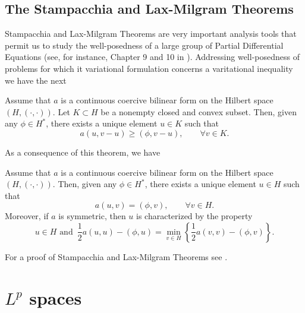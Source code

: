 \subsection*{The Stampacchia and Lax-Milgram Theorems}
Stampacchia and Lax-Milgram Theorems are very important analysis tools that permit us to study the well-posedness of a large group of Partial Differential Equations (see, for instance, Chapter 9 and 10 in \cite{brezis2011}). Addressing well-posedness of problems for which it variational formulation concerns a varitational inequality we have the next
\begin{theorem}[Stampacchia]\label{theo:stampacchia}Assume that $a$ is a continuous coercive bilinear form on the Hilbert space $(H,(\cdot,\cdot))$. Let $K\subset H$ be a nonempty closed and convex subset. Then, given any $\phi \in H^*$, there exists a unique element $u\in K$ such that
\begin{equation}
	a(u,v-u)\geq \left( \phi,v-u\right),\qquad \forall v \in K.
\end{equation}
\end{theorem}
As a consequence of this theorem, we have
\begin{corollary}Assume that $a$ is a continuous coercive bilinear form on the Hilbert space $(H,(\cdot,\cdot))$. Then, given any $\phi\in H^*$, there exists a unique element $u\in H$ such that
\begin{equation}
a(u,v)=\left(\phi,v\right),\qquad \forall v\in H.
\end{equation}
Moreover, if $a$ is symmetric, then $u$ is characterized by the property
\begin{equation*}
u\in H \text{ and }\,\frac{1}{2}a(u,u)-\left(\phi,u\right)=\min_{v\in H}\left\{\frac{1}{2}a(v,v)-(\phi,v)\right\}.
\end{equation*}
\end{corollary}
For a proof of Stampacchia and Lax-Milgram Theorems see \cite{brezis2011}.
\section{\texorpdfstring{$L^p$}{Lp} spaces}
